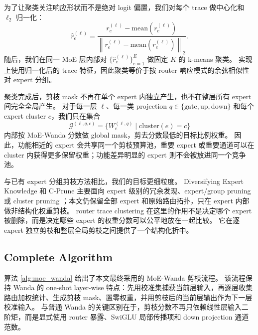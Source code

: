 \documentclass[letterpaper]{article}
\begin{document}
为了让聚类关注响应形状而不是绝对 logit 偏置，我们对每个 trace 做中心化和 $\ell_2$ 归一化：
\begin{equation}
    \widehat r^{(\ell)}_e
    =
    \frac{
        r^{(\ell)}_e
        -
        \mathrm{mean}(r^{(\ell)}_e)
    }{
        \left\|
        r^{(\ell)}_e
        -
        \mathrm{mean}(r^{(\ell)}_e)
        \right\|_2
    }.
\end{equation}
随后，我们在同一 MoE 层内部对 $\{\widehat r^{(\ell)}_e\}_{e=1}^{E}$ 做固定 $K$ 的 k-means 聚类。
实现上使用归一化后的 trace 特征，因此聚类等价于按 router 响应模式的余弦相似性对 expert 分组。

聚类完成后，剪枝 mask 不再在单个 expert 内独立产生，也不在整层所有 expert 间完全全局产生。
对于每一层 $\ell$、每一类 projection $q\in\{\mathrm{gate},\mathrm{up},\mathrm{down}\}$ 和每个 expert cluster $c$，我们只在集合
\begin{equation}
    \mathcal{G}^{(\ell,q,c)}
    =
    \{
    W^{(\ell,q)}_e
    \mid
    \mathrm{cluster}(e)=c
    \}
\end{equation}
内部按 MoE-Wanda 分数做 global mask，剪去分数最低的目标比例权重。
因此，功能相近的 expert 会共享同一个剪枝预算池，重要 expert 或重要通道可以在 cluster 内获得更多保留权重；功能差异明显的 expert 则不会被放进同一个竞争池。

与已有 expert 分组剪枝方法相比，我们的目标更细粒度。
Diversifying Expert Knowledge 和 C-Prune 主要面向 expert 级别的冗余发现、expert/group pruning 或 cluster pruning \cite{zhang2025diversifying,guo2025cprune}；本文仍保留全部 expert 和原始路由拓扑，只在 expert 内部做非结构化权重剪枝。
router trace clustering 在这里的作用不是决定哪个 expert 被删除，而是决定哪些 expert 的权重分数可以公平地放在一起比较。
它在逐 expert 独立剪枝和整层全局剪枝之间提供了一个结构化折中。

\subsection{Complete Algorithm}

算法 \ref{alg:moe_wanda} 给出了本文最终采用的 MoE-Wanda 剪枝流程。
该流程保持 Wanda 的 one-shot layer-wise 特点：先用校准集捕获当前层输入，再逐层收集路由加权统计、生成剪枝 mask、置零权重，并用剪枝后的当前层输出作为下一层校准输入。
与普通 Wanda 的关键区别在于，剪枝分数不再只依赖线性层输入二阶矩，而是显式使用 router 暴露、SwiGLU 局部传播项和 down projection 通道范数。
\end{document}
